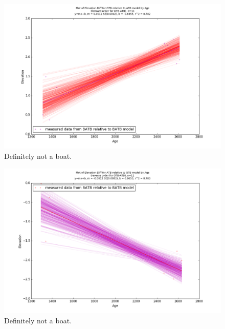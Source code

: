 \documentclass{article}
\begin{document}
\begin{figure}[h]
	\includegraphics[width=\linewidth]{data/gias/theGIA_GTB_relative_to_ATB.png}
	\caption{Definitely not a boat.}
	\label{fig:gias_GTBxATB}
\end{figure}
\newpage


\begin{figure}[h]
	\includegraphics[width=\linewidth]{data/gias/theGIA_ATB_relative_to_GTB.png}
	\caption{Definitely not a boat.}
	\label{fig:gias_ATBxGTB}
\end{figure}
\newpage
\end{document}
